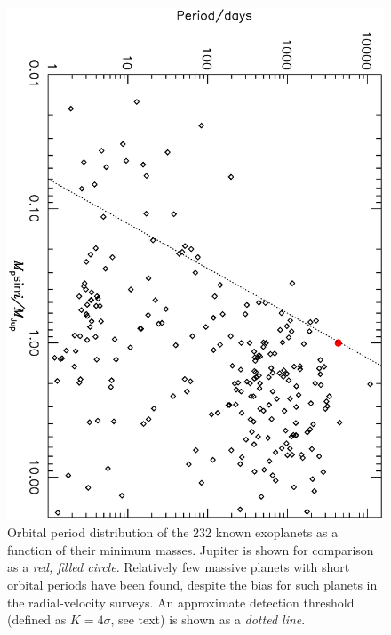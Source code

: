 \begin{figure}
\begin{center}
\centering
\includegraphics[angle=90,width=.90\textwidth]{1_rvplanets}
\caption[Orbital period distribution of the 232 known exoplanets]{%
Orbital period distribution of the 232 known exoplanets as a function of their minimum masses.
Jupiter is shown for comparison as a {\it red, filled circle}.
Relatively few massive planets with short orbital periods have been found, despite the bias for such planets in the radial-velocity surveys.
An approximate detection threshold (defined as $K=4\sigma$, see text) is shown as a {\it dotted line}.%
}
\label{cha:intro:sec:methods:sub:rv:fig:rv}
\end{center}
\end{figure}

